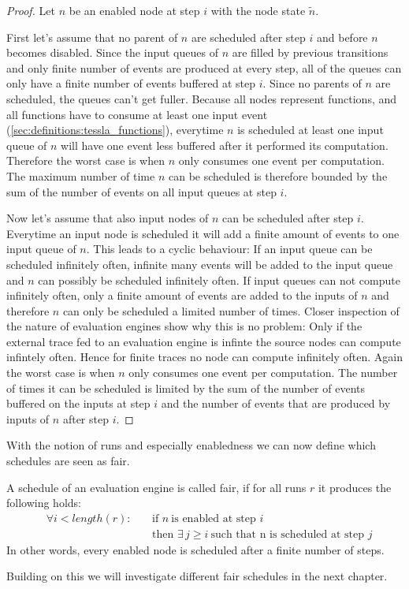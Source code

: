 \begin{proof}
  Let \(n\) be an enabled node at step \(i\) with the node state \(\widetilde{n}\).

  First let's assume that no parent of \(n\) are scheduled after step \(i\) and before \(n\) becomes disabled.
  Since the input queues of \(n\) are filled by previous transitions and only finite number of events are produced at every step, all of the queues can only have a finite number of events buffered at step \(i\).
  Since no parents of \(n\) are scheduled, the queues can't get fuller.
  Because all nodes represent functions, and all functions have to consume at least one input event (\cref{sec:definitions:tessla_functions}), everytime \(n\) is scheduled at least one input queue of \(n\) will have one event less buffered after it performed its computation.
  Therefore the worst case is when \(n\) only consumes one event per computation.
  The maximum number of time \(n\) can be scheduled is therefore bounded by the sum of the number of events on all input queues at step \(i\).

  Now let's assume that also input nodes of \(n\) can be scheduled after step \(i\).
  Everytime an input node is scheduled it will add a finite amount of events to one input queue of \(n\).
  This leads to a cyclic behaviour: If an input queue can be scheduled infinitely often, infinite many events will be added to the input queue and \(n\) can possibly be scheduled infinitely often.
  If input queues can not compute infinitely often, only a finite amount of events are added to the inputs of \(n\) and therefore \(n\) can only be scheduled a limited number of times.
  Closer inspection of the nature of evaluation engines show why this is no problem: Only if the external trace fed to an evaluation engine is infinte the source nodes can compute infintely often.
  Hence for finite traces no node can compute infinitely often.
  Again the worst case is when \(n\) only consumes one event per computation.
  The number of times it can be scheduled is limited by the sum of the number of events buffered on the inputs at step \(i\) and the number of events that are produced by inputs of \(n\) after step \(i\).
\end{proof}

With the notion of runs and especially enabledness we can now define which schedules are seen as fair.

\begin{definition}[name = Fair Schedules]\label{def:fair_schedule}
  A schedule of an evaluation engine is called fair, if for all runs \(r\)  it produces the following holds:
  \begin{align*}
    &\forall i < \mathit{length}(r):\ &&\text{if }n\ \text{is enabled at step } i\\
    &                                 &&\text{then } \exists\, j \geq i\ \text{such that n is scheduled at step } j
\end{align*}
In other words, every enabled node is scheduled after a finite number of steps.
\end{definition}

Building on this we will investigate different fair schedules in the next chapter.
